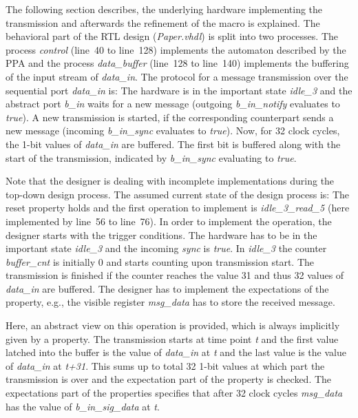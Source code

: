 The following section describes, the underlying hardware implementing the transmission and afterwards the refinement of the macro is explained.
The behavioral part of the RTL design (\textit{Paper.vhdl}) is split into two processes. 
The process \textit{control} (line~40 to line~128) implements the automaton described by the PPA and the process \textit{data\_buffer} (line~128 to line~140) implements the buffering of the input stream of \textit{data\_in}. 
The protocol for a message transmission over the sequential port \textit{data\_in} is: 
The hardware is in the important state \textit{idle\_3} and the abstract port \textit{b\_in} waits for a new message  (outgoing \textit{b\_in\_notify} evaluates to \textit{true}). 
A new transmission is started, if the corresponding counterpart sends a new message (incoming \textit{b\_in\_sync} evaluates to \textit{true}).
Now, for 32 clock cycles, the 1-bit values of \textit{data\_in} are buffered. 
The first bit is buffered along with the start of the transmission, indicated by \textit{b\_in\_sync} evaluating to \textit{true}.

Note that the designer is dealing with incomplete implementations during the top-down design process.
The assumed current state of the design process is: The reset property holds and the first operation to implement is \textit{idle\_3\_read\_5} (here implemented by line~56 to line~76). 
In order to implement the operation, the designer starts with the trigger conditions. 
The hardware has to be in the important state \textit{idle\_3} and the incoming \textit{sync} is \textit{true}.  
In \textit{idle\_3} the counter \textit{buffer\_cnt} is initially 0 and starts counting upon transmission start. 
The transmission is finished if the counter reaches the value 31 and thus 32 values of \textit{data\_in} are buffered.
The designer has to implement the expectations of the property, e.g., the visible register \textit{msg\_data} has to store the received message. 

Here, an abstract view on this operation is provided, which is always implicitly given by a property. 
The transmission starts at time point \textit{t} and the first value latched into the buffer is the value of \textit{data\_in} at \textit{t} and the last value is the value of \textit{data\_in} at \textit{t+31}. 
This sums up to total 32 1-bit values at which part the transmission is over and the expectation part of the property is checked. 
The expectations part of the properties specifies that after 32 clock cycles \textit{msg\_data} has the value of \textit{b\_in\_sig\_data} at \textit{t}. 

